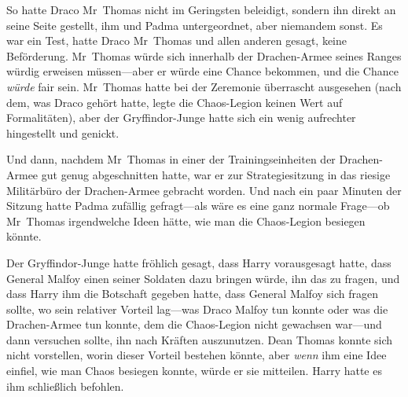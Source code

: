 So hatte Draco Mr~Thomas nicht im Geringsten beleidigt, sondern ihn direkt an seine Seite gestellt, ihm und Padma untergeordnet, aber niemandem sonst. Es war ein Test, hatte Draco Mr~Thomas und allen anderen gesagt, keine Beförderung. Mr~Thomas würde sich innerhalb der Drachen-Armee seines Ranges würdig erweisen müssen—aber er würde eine Chance bekommen, und die Chance \emph{würde} fair sein. Mr~Thomas hatte bei der Zeremonie überrascht ausgesehen (nach dem, was Draco gehört hatte, legte die Chaos-Legion keinen Wert auf Formalitäten), aber der Gryffindor-Junge hatte sich ein wenig aufrechter hingestellt und genickt.

Und dann, nachdem Mr~Thomas in einer der Trainingseinheiten der Drachen-Armee gut genug abgeschnitten hatte, war er zur Strategiesitzung in das riesige Militärbüro der Drachen-Armee gebracht worden. Und nach ein paar Minuten der Sitzung hatte Padma zufällig gefragt—als wäre es eine ganz normale Frage—ob Mr~Thomas irgendwelche Ideen hätte, wie man die Chaos-Legion besiegen könnte.

Der Gryffindor-Junge hatte fröhlich gesagt, dass Harry vorausgesagt hatte, dass General Malfoy einen seiner Soldaten dazu bringen würde, ihn das zu fragen, und dass Harry ihm die Botschaft gegeben hatte, dass General Malfoy sich fragen sollte, wo sein relativer Vorteil lag—was Draco Malfoy tun konnte oder was die Drachen-Armee tun konnte, dem die Chaos-Legion nicht gewachsen war—und dann versuchen sollte, ihn nach Kräften auszunutzen. Dean Thomas konnte sich nicht vorstellen, worin dieser Vorteil bestehen könnte, aber \emph{wenn} ihm eine Idee einfiel, wie man Chaos besiegen konnte, würde er sie mitteilen. Harry hatte es ihm schließlich befohlen.


